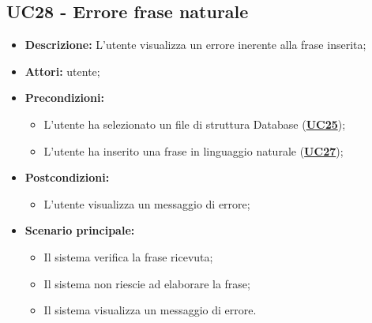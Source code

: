 \subsection{UC28 - Errore frase naturale}
\label{sec:UC28}
\begin{itemize}
	\item \textbf{Descrizione:} L’utente visualizza un errore inerente alla frase inserita;
	\item \textbf{Attori:} utente;
	\item \textbf{Precondizioni:} 
	\begin{itemize}
		\item L’utente ha selezionato un file di struttura Database (\hyperref[sec:UC25]{\textbf{UC25}});
		\item L'utente ha inserito una frase in linguaggio naturale (\hyperref[sec:UC27]{\textbf{UC27}});
	\end{itemize}
	\item \textbf{Postcondizioni:} 
	\begin{itemize}
		\item L’utente visualizza un messaggio di errore;
	\end{itemize}
	\item \textbf{Scenario principale:} 
	\begin{itemize}
		\item Il sistema verifica la frase ricevuta;
		\item Il sistema non riescie ad elaborare la frase;
		\item Il sistema visualizza un messaggio di errore.
	\end{itemize}
	\end{itemize}


